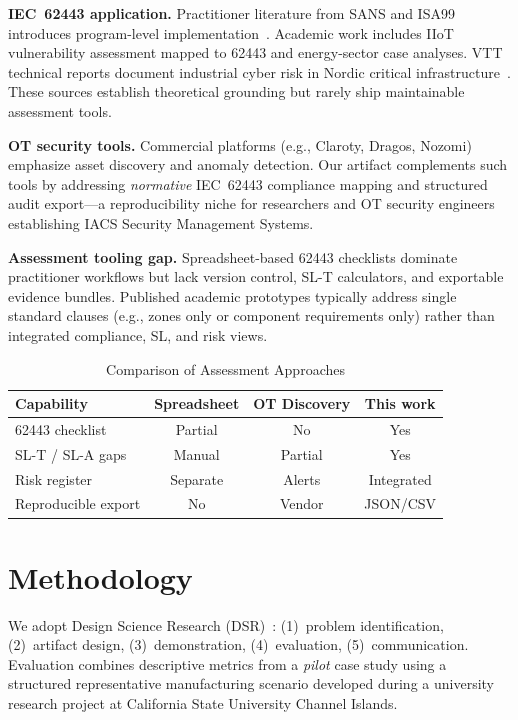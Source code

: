 \documentclass[10pt,conference]{IEEEtran}
\begin{document}
\textbf{IEC~62443 application.} Practitioner literature from SANS and ISA99 introduces program-level implementation~\cite{isa99intro}. Academic work includes IIoT vulnerability assessment mapped to 62443 and energy-sector case analyses. VTT technical reports document industrial cyber risk in Nordic critical infrastructure~\cite{vtt2018industrial}. These sources establish theoretical grounding but rarely ship maintainable assessment tools.

\textbf{OT security tools.} Commercial platforms (e.g., Claroty, Dragos, Nozomi) emphasize asset discovery and anomaly detection. Our artifact complements such tools by addressing \emph{normative} IEC~62443 compliance mapping and structured audit export---a reproducibility niche for researchers and OT security engineers establishing IACS Security Management Systems.

\textbf{Assessment tooling gap.} Spreadsheet-based 62443 checklists dominate practitioner workflows but lack version control, SL-T calculators, and exportable evidence bundles. Published academic prototypes typically address single standard clauses (e.g., zones only or component requirements only) rather than integrated compliance, SL, and risk views.

\begin{table}[!t]
\caption{Comparison of Assessment Approaches}
\label{tab:comparison}
\centering
\small
\begin{tabular}{lccc}
\hline
Capability & Spreadsheet & OT Discovery & This work \\
\hline
62443 checklist & Partial & No & Yes \\
SL-T / SL-A gaps & Manual & Partial & Yes \\
Risk register & Separate & Alerts & Integrated \\
Reproducible export & No & Vendor & JSON/CSV \\
\hline
\end{tabular}
\end{table}

\section{Methodology}
We adopt Design Science Research (DSR)~\cite{hevner2004design}: (1)~problem identification, (2)~artifact design, (3)~demonstration, (4)~evaluation, (5)~communication. Evaluation combines descriptive metrics from a \emph{pilot} case study using a structured representative manufacturing scenario developed during a university research project at California State University Channel Islands.
\end{document}
